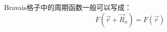 Bravais格子中的周期函数一般可以写成：
\begin{equation}
  F(\vec r+\vec R_n)=F(\vec r)
  \label{eq:solid-4}
\end{equation}

